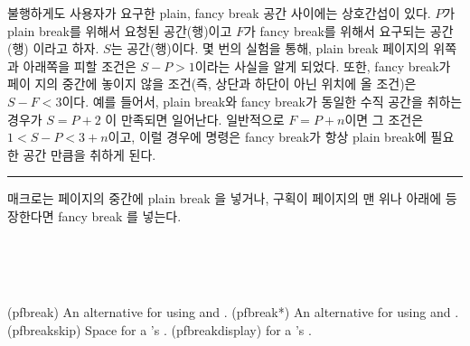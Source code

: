 불행하게도 사용자가 요구한 plain, fancy break 공간 사이에는 상호간섭이 있다. $ P $가
plain break를 위해서 요청된 공간(행)이고 $ F $가 fancy break를 위해서 요구되는 공간(행)
이라고 하자. $ S $는  공간(행)이다. 몇 번의 실험을 통해, plain break 페이지의 위쪽
과 아래쪽을 피할 조건은 $ S −P > 1 $이라는 사실을 알게 되었다. 또한, fancy break가 페이
지의 중간에 놓이지 않을 조건(즉, 상단과 하단이 아닌 위치에 올 조건)은 $ S − F < 3 $이다.
예를 들어서, plain break와 fancy break가 동일한 수직 공간을 취하는 경우가 $ S = P + 2 $
이 만족되면 일어난다. 일반적으로 $ F = P +n $이면 그 조건은 $ 1 < S −P < 3+n $이고, 이럴
경우에 \cmd{\plainfancybreak} 명령은 fancy break가 항상 plain break에 필요한 공간 만큼을
취하게 된다.



\fancybreak{\pfbreakdisplay}

\cmd{\plainfancybreak} 매크로는 페이지의 중간에 plain break 을 넣거나,
구획이 페이지의 맨 위나 아래에 등장한다면 fancy break 를 넣는다.

\begin{syntax}
\cmd{\pfbreak} \cmd{\pfbreak*} \\
\lnc{\pfbreakskip} \\
\cmd{\pfbreakdisplay} \\
\end{syntax}
\glossary(pfbreak)
  {}%
  {An alternative for  using 
   and .}
\glossary(pfbreak*)
  {}%
  {An alternative for  using 
   and .}
\glossary(pfbreakskip)%
  {}%
  {Space for a 's .}
\glossary(pfbreakdisplay)%
  {}%
  { for a 's .}
  
